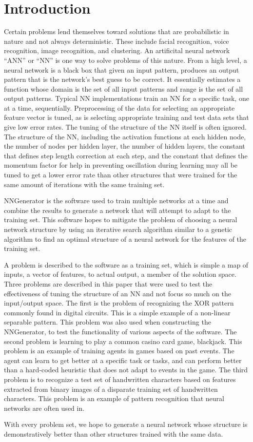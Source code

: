 \chapter[Introduction]{Introduction}
Certain problems lend themselves toward solutions that are probabilistic in nature and not always deterministic.
These include facial recognition, voice recognition, image recognition, and clustering. 
An artificital neural network ``ANN'' or ``NN'' is one way to solve problems of this nature. From a high level, a neural network is a black
box that given an input pattern, produces an output pattern that is the network's best guess to be correct. 
It essentially estimates a function whose domain is the set of all input patterns and range is the set of all output patterns. Typical NN implementations train an NN for a specific task, one at a time, sequentially. Preprocessing of the data for selecting an appropriate feature vector is tuned, as is selecting appropriate training and test data sets that give low error rates. The tuning of the structure of the NN itself is often ignored. The structure of the NN, including the activation functions at each hidden node, the number of nodes per hidden layer, the number of hidden layers, the constant that defines step length correction at each step, and the constant that defines the momentum factor for help in preventing oscillation during learning may all be tuned to get a lower error rate than other structures that were trained for the same amount of iterations with the same training set.

NNGenerator is the software used to train multiple networks at a time and combine the results to generate a network that will attempt to adapt to the training set. This software hopes to mitigate the problem of choosing a neural network structure by using an iterative search algorithm similar to a genetic algorithm to find an optimal structure of a neural network for the features of the training set. 

A problem is described to the software as a training set, which is simple a map of inputs, a vector of features, to actual output, a member of the solution space.
Three problems are described in this paper that were used to test the effectiveness of tuning the structure of an NN and not focus so much on the input/output space. The first is the problem of recognizing the XOR pattern commonly found in digital circuits. This is a simple example of a non-linear separable pattern. This problem was also used when constructing the NNGenerator, to test the functionality of various aspects of the software. The second problem is learning to play a common casino card game, blackjack. This problem is an example of training agents in games based on past events. The agent can learn to get better at a specific task or tasks, and can perform better than a hard-coded heuristic that does not adapt to events in the game. The third problem is to recognize a test set of handwritten characters based on features extracted from binary images of a disparate training set of handwritten characters. This problem is an example of pattern recognition that neural networks are often used in.

With every problem set, we hope to generate a neural network whose structure is demonstratively better than other structures trained with the same data.